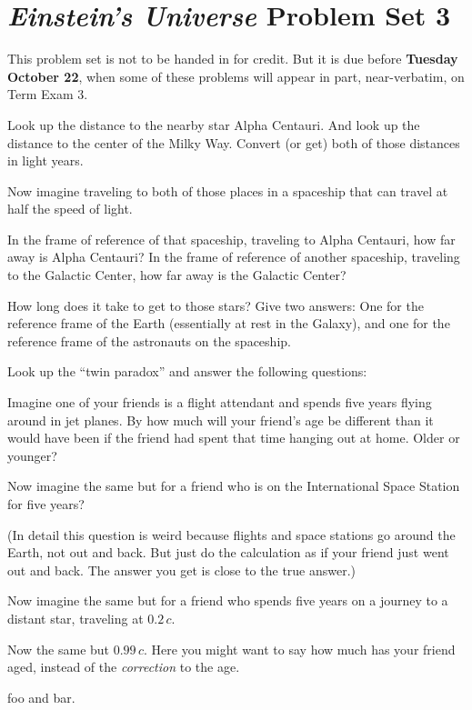 \documentclass[12pt, letterpaper]{article}
\begin{document}
\section*{\textsl{Einstein's Universe} Problem Set 3}

This problem set is not to be handed in for credit. But it is due
before \textbf{Tuesday October 22}, when some of these problems
will appear in part, near-verbatim, on Term Exam 3.

\begin{problem}
Look up the distance to the nearby star Alpha Centauri. And look up the
distance to the center of the Milky Way. Convert (or get) both of those
distances in light years.

Now imagine traveling to both of those places in a spaceship that can
travel at half the speed of light.

In the frame of reference of that spaceship, traveling to Alpha
Centauri, how far away is Alpha Centauri? In the frame of reference of
another spaceship, traveling to the Galactic Center, how far away is
the Galactic Center?

How long does it take to get to
those stars? Give two answers: One for the reference frame of the
Earth (essentially at rest in the Galaxy), and one for the reference
frame of the astronauts on the spaceship.
\end{problem}

\begin{problem}
Look up the ``twin paradox'' and answer the following questions:

Imagine one of your friends is a flight attendant and spends five years
flying around in jet planes. By how much will your friend's age be different
than it would have been if the friend had spent that time hanging out
at home. Older or younger?

Now imagine the same but for a friend who is on the International
Space Station for five years?

(In detail this question is weird because flights and space stations
go around the Earth, not out and back. But just do the calculation as
if your friend just went out and back. The answer you get is close to
the true answer.)

Now imagine the same but for a friend who spends five years on a journey
to a distant star, traveling at $0.2\,c$.

Now the same but $0.99\,c$. Here you might want to say how much has your
friend aged, instead of the \emph{correction} to the age.
\end{problem}

\begin{problem}
foo and bar.
\end{problem}
\end{document}
